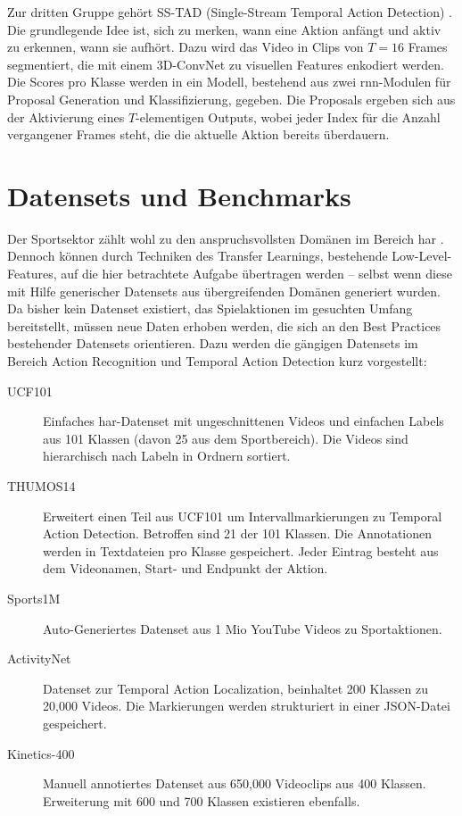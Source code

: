 Zur dritten Gruppe gehört \ua SS-TAD (Single-Stream Temporal Action Detection) \cite{Buch17}.
Die grundlegende Idee ist, sich zu merken, wann eine Aktion anfängt und aktiv zu erkennen, wann sie aufhört.
Dazu wird das Video in Clips von $T=16$ Frames segmentiert, die mit einem 3D-ConvNet zu visuellen Features enkodiert werden.
Die Scores pro Klasse werden in ein Modell, bestehend aus zwei \gls{rnn}-Modulen für Proposal Generation und Klassifizierung, gegeben.
Die Proposals ergeben sich aus der Aktivierung eines $T$-elementigen Outputs, wobei jeder Index für die Anzahl vergangener Frames steht, die die aktuelle Aktion bereits überdauern.

\section{Datensets und Benchmarks}
\label{sec:datensets-und-benchmarks}

Der Sportsektor zählt wohl zu den anspruchsvollsten Domänen im Bereich \gls{har} \cite{Sozykin17}.
Dennoch können durch Techniken des Transfer Learnings, bestehende Low-Level-Features, auf die hier betrachtete Aufgabe übertragen werden -- selbst wenn diese mit Hilfe generischer Datensets aus übergreifenden Domänen generiert wurden.
Da bisher kein Datenset existiert, das Spielaktionen im gesuchten Umfang bereitstellt, müssen neue Daten erhoben werden, die sich an den Best Practices bestehender Datensets orientieren.
Dazu werden die gängigen Datensets im Bereich Action Recognition und Temporal Action Detection kurz vorgestellt:

\begin{description}
    \item[UCF101] \cite{Soomro12} Einfaches \gls{har}-Datenset mit ungeschnittenen Videos und einfachen Labels aus 101 Klassen (davon 25 aus dem Sportbereich).
    Die Videos sind hierarchisch nach Labeln in Ordnern sortiert.
    \item[THUMOS14] \cite{THUMOS14} Erweitert einen Teil aus UCF101 um Intervallmarkierungen zu Temporal Action Detection.
    Betroffen sind 21 der 101 Klassen.
    Die Annotationen werden in Textdateien pro Klasse gespeichert.
    Jeder Eintrag besteht aus dem Videonamen, Start- und Endpunkt der Aktion.
    \item[Sports1M] \cite{Karpathy14} Auto-Generiertes Datenset aus 1 Mio YouTube Videos zu Sportaktionen.
    \item[ActivityNet] \cite{Caba15} Datenset zur Temporal Action Localization, beinhaltet 200 Klassen zu 20,000 Videos.
    Die Markierungen werden strukturiert in einer JSON-Datei gespeichert.
    \item[Kinetics-400] \cite{Kay17} Manuell annotiertes Datenset aus 650,000 Videoclips aus 400 Klassen.
    Erweiterung mit 600 und 700 Klassen existieren ebenfalls.
\end{description}

